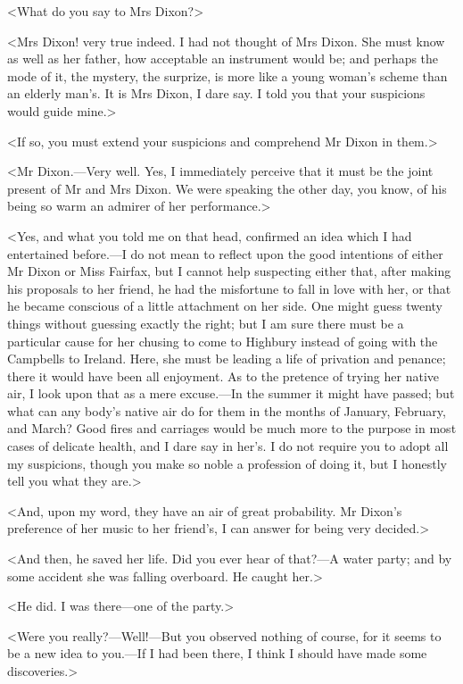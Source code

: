 <What do you say to Mrs Dixon?>

<Mrs Dixon! very true indeed. I had not thought of Mrs Dixon. She must know as well as her father, how acceptable an instrument would be; and perhaps the mode of it, the mystery, the surprize, is more like a young woman's scheme than an elderly man's. It is Mrs Dixon, I dare say. I told you that your suspicions would guide mine.>

<If so, you must extend your suspicions and comprehend Mr Dixon in them.>

<Mr Dixon.—Very well. Yes, I immediately perceive that it must be the joint present of Mr and Mrs Dixon. We were speaking the other day, you know, of his being so warm an admirer of her performance.>

<Yes, and what you told me on that head, confirmed an idea which I had entertained before.—I do not mean to reflect upon the good intentions of either Mr Dixon or Miss Fairfax, but I cannot help suspecting either that, after making his proposals to her friend, he had the misfortune to fall in love with her, or that he became conscious of a little attachment on her side. One might guess twenty things without guessing exactly the right; but I am sure there must be a particular cause for her chusing to come to Highbury instead of going with the Campbells to Ireland. Here, she must be leading a life of privation and penance; there it would have been all enjoyment. As to the pretence of trying her native air, I look upon that as a mere excuse.—In the summer it might have passed; but what can any body's native air do for them in the months of January, February, and March? Good fires and carriages would be much more to the purpose in most cases of delicate health, and I dare say in her's. I do not require you to adopt all my suspicions, though you make so noble a profession of doing it, but I honestly tell you what they are.>

<And, upon my word, they have an air of great probability. Mr Dixon's preference of her music to her friend's, I can answer for being very decided.>

<And then, he saved her life. Did you ever hear of that?—A water party; and by some accident she was falling overboard. He caught her.>

<He did. I was there—one of the party.>

<Were you really?—Well!—But you observed nothing of course, for it seems to be a new idea to you.—If I had been there, I think I should have made some discoveries.>

